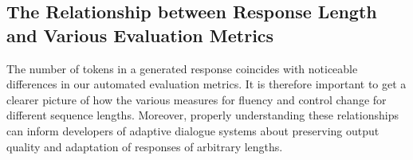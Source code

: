 

\subsection{The Relationship between Response Length and Various Evaluation Metrics}
\label{subsec:ctg_anal_response_length}

The number of tokens in a generated response coincides with noticeable differences in our automated evaluation metrics. It is therefore important to get a clearer picture of how the various measures for fluency and control change for different sequence lengths. Moreover, properly understanding these relationships can inform developers of adaptive dialogue systems about preserving output quality and adaptation of responses of arbitrary lengths.

